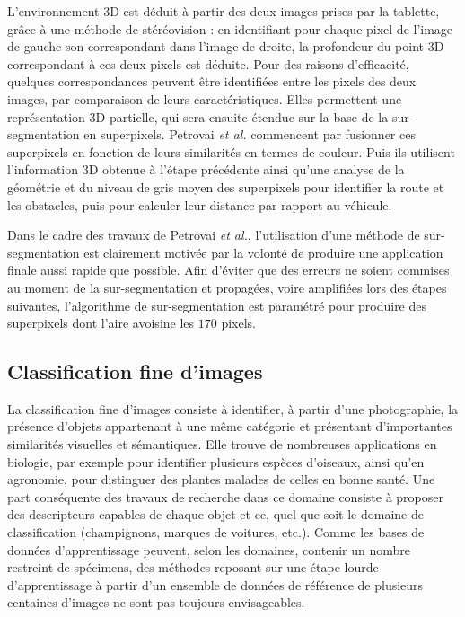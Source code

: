 L'environnement 3D est déduit à partir des deux images prises par la tablette, grâce à une méthode de stéréovision : en identifiant pour chaque pixel de l'image de gauche son correspondant dans l'image de droite, la profondeur du point 3D correspondant à ces deux pixels est déduite. Pour des raisons d'efficacité,  quelques correspondances peuvent être identifiées entre les pixels des deux images, par comparaison de leurs caractéristiques. Elles permettent une représentation 3D partielle, qui sera ensuite étendue sur la base de la sur-segmentation en superpixels. Petrovai \textit{et al.} commencent par fusionner ces superpixels  en fonction de leurs similarités en termes de couleur. Puis ils utilisent l'information 3D obtenue à l'étape précédente ainsi qu'une analyse de la géométrie et du niveau de gris moyen des superpixels pour identifier la route et les obstacles, puis pour calculer leur distance par rapport au véhicule. 

Dans le cadre des travaux de Petrovai \textit{et al.}, l'utilisation d'une méthode de sur-segmentation est clairement motivée par la volonté de produire une application finale aussi rapide que possible. Afin d'éviter que des erreurs ne soient commises au moment de la sur-segmentation et propagées, voire amplifiées lors des étapes suivantes, l'algorithme de sur-segmentation est paramétré pour produire des superpixels dont l'aire avoisine les $170$ pixels. 

\subsection{Classification fine d'images}
La classification fine d'images consiste à identifier, à partir d'une photographie, la présence d'objets appartenant à une même catégorie et présentant d'importantes similarités visuelles et sémantiques. Elle trouve de nombreuses applications en biologie,  par exemple pour identifier plusieurs espèces d'oiseaux, ainsi qu'en agronomie,  pour distinguer des plantes malades de celles en bonne santé.  Une part conséquente des travaux de recherche dans ce domaine consiste à proposer des descripteurs capables de  chaque objet et ce, quel que soit le domaine de classification (champignons, marques de voitures, etc.). Comme les bases de données d'apprentissage peuvent, selon les domaines, contenir un nombre restreint de spécimens, des méthodes reposant sur une étape lourde d'apprentissage à partir d'un ensemble de données de référence  de plusieurs centaines d'images ne sont pas toujours envisageables. 

